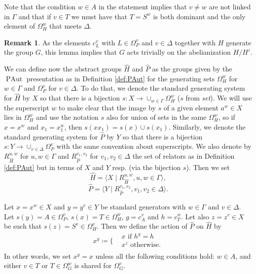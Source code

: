 \documentclass[10pt]{amsart}
\theoremstyle{definition}
\newtheorem{remark}[theorem]{Remark}
\newcommand{\PAut}{\operatorname{PAut}}
\theoremstyle{definition}
\numberwithin{equation}{section}
\begin{document}
Note that the condition $w\in A$ in the statement implies that $v\neq w$ are not linked in $\Gamma$ and that if $v\in T$ we must have that $T=S^w$ is both dominant and the only element of $\Omega_H^w$ that meets $\Delta$.



\begin{remark} As the elements $c_L^v$ with $L \in \Omega_P^v$ and $v\in\Delta$ together with $H$ generate the group $G$, this lemma implies that $G$ acts trivially on the abelianization $H/H'$.
\end{remark}

We can define now the abstract groups $\hat H$ and $\hat P$ as the groups given by the $\PAut$ presentation as in Definition \ref{def:PAut} for the generating sets $\Omega^w_H$ for $w\in\Gamma$ and $\Omega^v_P$ for $v\in\Delta$. To do that, we denote the standard generating system for $\hat H$ by $X$ so that there is a bijection $s\colon X\to\cup_{w\in\Gamma}\Omega^w_H$ ($s$ from {\sl set}). We will use the superscript $w$ to make clear that the image by $s$ of a given element $a^w\in X$ lies in $\Omega^w_H$ and use the notation $s$ also for union of sets in the same $\Omega^w_H$, so if $x=x^w$ and $x_1=x_1^w$, then $s(xx_1)=s(x)\cup s(x_1)$.  Similarly, we denote the standard generating system for $\hat P$ by $Y$ so that there is a bijection $s:Y\to\cup_{v\in\Delta}\Omega^v_P$ with the same convention about superscripts.
We also denote by $R_{\hat H}^{u,w}$ for $u,w\in\Gamma$ and $R_{\hat P}^{v_1,v_2}$ for $v_1,v_2\in\Delta$ the set of relators as in Definition \ref{def:PAut} but in terms of $X$ and $Y$ resp. (via the bijection $s$). Then we set
\[\hat H=\langle X\mid R_{\hat H}^{u,w},u,w\in\Gamma\rangle,\]
\[\hat P=\langle Y\mid R_{\hat P}^{v_1,v_2},v_1,v_2\in\Delta\rangle.\]


Let $x=x^w\in X$ and $y=y^v\in Y$ be standard generators with $w\in\Gamma$ and $v\in\Delta$. Let $s(y)=A\in\Omega_P^v$, $s(x)=T\in\Omega^w_H$, $g=c^v_A$ and $h=c^w_T$. Let also $z=z^v\in X$ be such that $s(z)=S^v\in\Omega^v_H$. Then we define the action of $\hat{P}$ on $\hat{H}$ by
\begin{equation} \label{def.action.P.H}
x^y\coloneqq \Bigg\{
\begin{aligned}
&x\text{ if }h^g=h\\
&x^z\text{ otherwise.}\\
\end{aligned}
\end{equation}
In other words, we set $x^y=x$ unless all the following conditions hold: $w\in A$, and either $v\in T$ or $T\in\Omega_G^w$ is shared for $\Omega_G^v$.
\end{document}
